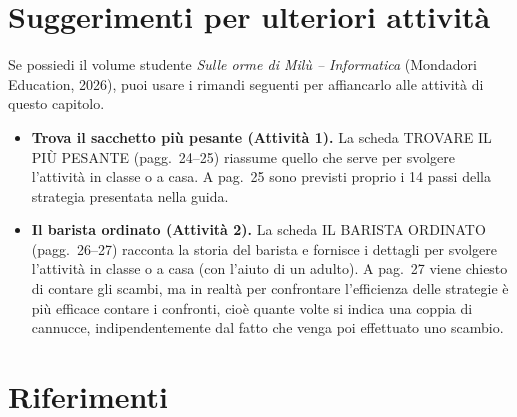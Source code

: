 \section{Suggerimenti per ulteriori attività}\label{suggerimenti-per-ulteriori-attivituxe0-e-riferimenti-3}

\printbibliography[heading=none,keyword={cap6},category={attivita}]

\begin{rimandiquaderno}
Se possiedi il volume studente \emph{Sulle orme di Milù -- Informatica}
(Mondadori Education, 2026), puoi usare i rimandi seguenti per affiancarlo
alle attività di questo capitolo.\par\smallskip

\begin{itemize}[leftmargin=*,itemsep=5pt,topsep=4pt]
\item \textbf{Trova il sacchetto più pesante (Attività 1).} La scheda TROVARE IL PIÙ PESANTE (pagg.~24--25) riassume quello che serve per svolgere l'attività in classe o a casa. A pag.~25 sono previsti proprio i 14 passi della strategia presentata nella guida.
\item \textbf{Il barista ordinato (Attività 2).} La scheda IL BARISTA ORDINATO (pagg.~26--27) racconta la storia del barista e fornisce i dettagli per svolgere l'attività in classe o a casa (con l'aiuto di un adulto). A pag.~27 viene chiesto di contare gli scambi, ma in realtà per confrontare l'efficienza delle strategie è più efficace contare i confronti, cioè quante volte si indica una coppia di cannucce, indipendentemente dal fatto che venga poi effettuato uno scambio.
\end{itemize}
\end{rimandiquaderno}

\section{Riferimenti}\label{riferimenti-cap6}

\printbibliography[heading=none,keyword={cap6},notcategory={attivita}]
